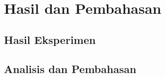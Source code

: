 \chapter{Hasil dan Pembahasan}
\label{chap:hasil_pembahasan}

\section{Hasil Eksperimen}
\label{sec:hasil_eksperimen}

\section{Analisis dan Pembahasan}
\label{sec:analisis_pembahasan}
